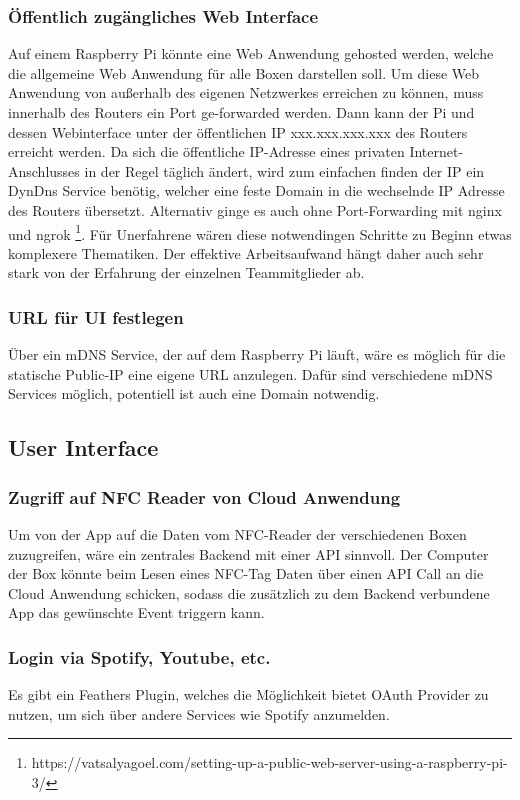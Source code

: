 \documentclass[10pt, a4paper]{article}
\begin{document}
\subsubsection{Öffentlich zugängliches Web Interface}
Auf einem Raspberry Pi könnte eine Web Anwendung gehosted werden, welche die allgemeine Web Anwendung für alle Boxen darstellen soll.
Um diese Web Anwendung von außerhalb des eigenen Netzwerkes erreichen zu können, muss innerhalb des Routers ein Port ge-forwarded werden.
Dann kann der Pi und dessen Webinterface unter der öffentlichen IP xxx.xxx.xxx.xxx des Routers erreicht werden.
Da sich die öffentliche IP-Adresse eines privaten Internet-Anschlusses in der Regel täglich ändert, wird zum einfachen finden der IP ein DynDns Service benötig, welcher eine feste Domain in die wechselnde IP Adresse des Routers übersetzt.
Alternativ ginge es auch ohne Port-Forwarding mit nginx und ngrok \footnote{https://vatsalyagoel.com/setting-up-a-public-web-server-using-a-raspberry-pi-3/}.
Für Unerfahrene wären diese notwendingen Schritte zu Beginn etwas komplexere Thematiken. Der effektive Arbeitsaufwand hängt daher auch sehr stark von der Erfahrung der einzelnen Teammitglieder ab.

\subsubsection{URL für UI festlegen}
Über ein mDNS Service, der auf dem Raspberry Pi läuft, wäre es möglich für die statische Public-IP eine eigene URL anzulegen.
Dafür sind verschiedene mDNS Services möglich, potentiell ist auch eine Domain notwendig.

\subsection{User Interface}
\subsubsection{Zugriff auf NFC Reader von Cloud Anwendung}
Um von der App auf die Daten vom NFC-Reader der verschiedenen Boxen zuzugreifen, wäre ein zentrales Backend mit einer API sinnvoll.
Der Computer der Box könnte beim Lesen eines NFC-Tag Daten über einen API Call an die Cloud Anwendung schicken, sodass die zusätzlich zu dem Backend verbundene App das gewünschte Event triggern kann.

\subsubsection{Login via Spotify, Youtube, etc.}
Es gibt ein Feathers Plugin, welches die Möglichkeit bietet OAuth Provider zu nutzen, um sich über andere Services wie Spotify anzumelden.
\end{document}
